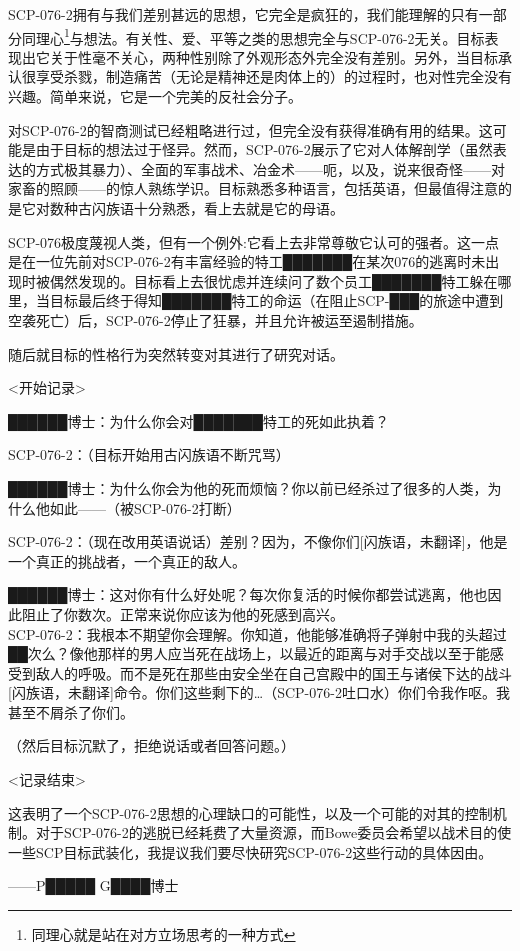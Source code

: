 \begin{scpbox}

SCP-076-2拥有与我们差别甚远的思想，它完全是疯狂的，我们能理解的只有一部分同理心\footnote{同理心就是站在对方立场思考的一种方式}与想法。有关性、爱、平等之类的思想完全与SCP-076-2无关。目标表现出它关于性毫不关心，两种性别除了外观形态外完全没有差别。另外，当目标承认很享受杀戮，制造痛苦（无论是精神还是肉体上的）的过程时，也对性完全没有兴趣。简单来说，它是一个完美的反社会分子。

对SCP-076-2的智商测试已经粗略进行过，但完全没有获得准确有用的结果。这可能是由于目标的想法过于怪异。然而，SCP-076-2展示了它对人体解剖学（虽然表达的方式极其暴力）、全面的军事战术、冶金术——呃，以及，说来很奇怪——对家畜的照顾——的惊人熟练学识。目标熟悉多种语言，包括英语，但最值得注意的是它对数种古闪族语十分熟悉，看上去就是它的母语。

SCP-076极度蔑视人类，但有一个例外:它看上去非常尊敬它认可的强者。这一点是在一位先前对SCP-076-2有丰富经验的特工███████在某次076的逃离时未出现时被偶然发现的。目标看上去很忧虑并连续问了数个员工███████特工躲在哪里，当目标最后终于得知███████特工的命运（在阻止SCP-███的旅途中遭到空袭死亡）后，SCP-076-2停止了狂暴，并且允许被运至遏制措施。

随后就目标的性格行为突然转变对其进行了研究对话。

\begin{scpbox}

<开始记录>

██████博士：为什么你会对███████特工的死如此执着？

SCP-076-2：（目标开始用古闪族语不断咒骂）

██████博士：为什么你会为他的死而烦恼？你以前已经杀过了很多的人类，为什么他如此——（被SCP-076-2打断）

SCP-076-2：（现在改用英语说话）差别？因为，不像你们{[}闪族语，未翻译]，他是一个真正的挑战者，一个真正的敌人。

██████博士：这对你有什么好处呢？每次你复活的时候你都尝试逃离，他也因此阻止了你数次。正常来说你应该为他的死感到高兴。\\
SCP-076-2：我根本不期望你会理解。你知道，他能够准确将子弹射中我的头超过██次么？像他那样的男人应当死在战场上，以最近的距离与对手交战以至于能感受到敌人的呼吸。而不是死在那些由安全坐在自己宫殿中的国王与诸侯下达的战斗{[}闪族语，未翻译]命令。你们这些剩下的…（SCP-076-2吐口水）你们令我作呕。我甚至不屑杀了你们。

（然后目标沉默了，拒绝说话或者回答问题。）

<记录结束>

\end{scpbox}

这表明了一个SCP-076-2思想的心理缺口的可能性，以及一个可能的对其的控制机制。对于SCP-076-2的逃脱已经耗费了大量资源，而Bowe委员会希望以战术目的使一些SCP目标武装化，我提议我们要尽快研究SCP-076-2这些行动的具体因由。

——P█████ G████博士

\end{scpbox}


